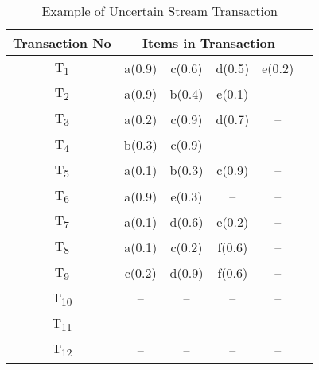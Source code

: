 %
%
\begin{table}[ht]
\centering

\begin{tabular}{|c|c|c|c|c|c|}
\hline
	Transaction No & \multicolumn{4}{c|}{Items in Transaction} \\ \hline \hline
	T\textsubscript{1} & a(0.9) & c(0.6) & d(0.5) & e(0.2)			\\\hline
	T\textsubscript{2} & a(0.9) & b(0.4) & e(0.1) & --    			\\\hline
	T\textsubscript{3} & a(0.2) & c(0.9) & d(0.7) & --    			\\\hline
	T\textsubscript{4} & b(0.3) & c(0.9) & -- & --			\\\hline
	T\textsubscript{5} & a(0.1) & b(0.3) & c(0.9) & --    			\\\hline
	T\textsubscript{6} & a(0.9) & e(0.3) & -- & --        			\\\hline
   	T\textsubscript{7} & a(0.1) & d(0.6) & e(0.2) & --		\\\hline
	T\textsubscript{8} & a(0.1) & c(0.2) & f(0.6) & --    			\\\hline
	T\textsubscript{9} & c(0.2) & d(0.9) & f(0.6) & --    			\\\hline
	
	T\textsubscript{10} &  --  &  --  &  --  & --    				\\\hline
	T\textsubscript{11} &  --  &  --  &  --  & --    				\\\hline
	T\textsubscript{12} &  --  &  --  &  --  & --    				\\\hline
	
		
\end{tabular}
\label{tab:ex_u}
\caption{Example of Uncertain Stream Transaction}
\label{table:uncertain_stream_transaction}
\end{table}
%